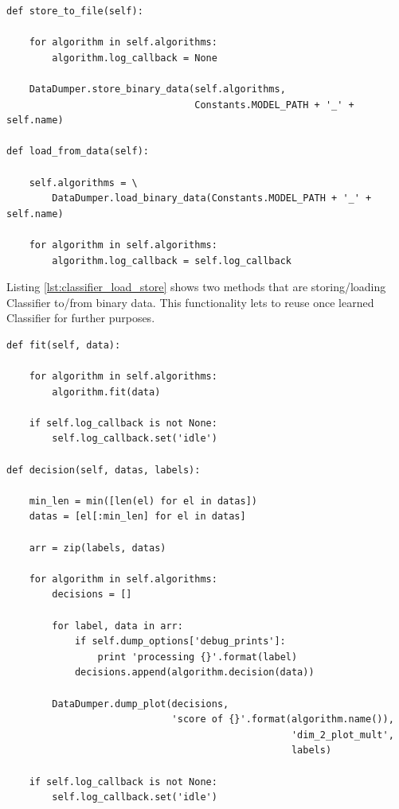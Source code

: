 \documentclass[magister]{dyplom}
\begin{document}
	\begingroup
	\begin{verbatim}
def store_to_file(self):

    for algorithm in self.algorithms:
        algorithm.log_callback = None

    DataDumper.store_binary_data(self.algorithms,
                                 Constants.MODEL_PATH + '_' + self.name)

def load_from_data(self):

    self.algorithms = \
        DataDumper.load_binary_data(Constants.MODEL_PATH + '_' + self.name)

    for algorithm in self.algorithms:
        algorithm.log_callback = self.log_callback
	\end{verbatim}
	\endgroup
	\vspace{1em}
	
	Listing \ref{lst:classifier_load_store} shows two methods that are storing/loading Classifier to/from binary data. This functionality lets to reuse once learned Classifier for further purposes. \\
	
	\begingroup
	\begin{verbatim}
def fit(self, data):

    for algorithm in self.algorithms:
        algorithm.fit(data)

    if self.log_callback is not None:
        self.log_callback.set('idle')

def decision(self, datas, labels):

    min_len = min([len(el) for el in datas])
    datas = [el[:min_len] for el in datas]

    arr = zip(labels, datas)

    for algorithm in self.algorithms:
        decisions = []

        for label, data in arr:
            if self.dump_options['debug_prints']:
                print 'processing {}'.format(label)
            decisions.append(algorithm.decision(data))
        
        DataDumper.dump_plot(decisions, 
                             'score of {}'.format(algorithm.name()), 
                                                  'dim_2_plot_mult', 
                                                  labels)

    if self.log_callback is not None:
        self.log_callback.set('idle')
	\end{verbatim}
	\endgroup
	\vspace{1em}
	
\end{document}
